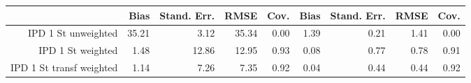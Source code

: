 \begin{table}[ht]
\centering
\begin{tabular}{rrrrrrrrr}
  \toprule
 & Bias & Stand. Err. & RMSE & Cov. & Bias & Stand. Err. & RMSE & Cov. \\ 
  \midrule
IPD 1 St unweighted & 35.21 & 3.12 & 35.34 & 0.00 & 1.39 & 0.21 & 1.41 & 0.00 \\ 
  IPD 1 St weighted & 1.48 & 12.86 & 12.95 & 0.93 & 0.08 & 0.77 & 0.78 & 0.91 \\ 
  IPD 1 St transf weighted & 1.14 & 7.26 & 7.35 & 0.92 & 0.04 & 0.44 & 0.44 & 0.92 \\ 
   \bottomrule
\end{tabular}
\end{table}
